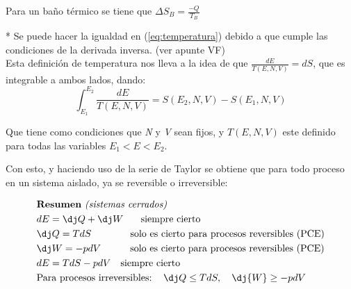 Para un baño térmico se tiene que $\Delta S_B = \frac{-Q}{T_B}$
\\





* Se puede hacer la igualdad en (\ref{eq:temperatura}) debido a que cumple las condiciones de la derivada inversa. (ver apunte VF)
\\

Esta definición de temperatura nos lleva a la idea de que $\frac{dE}{T(E,N,V)} = dS$, que es integrable a ambos lados, dando:
\[\int_{E_1}^{E_2} \frac{dE}{T(E,N,V)} = S(E_2,N,V) - S(E_1,N,V)\]

Que tiene como condiciones que \textit{N} y \textit{V} sean fijos, y $T(E,N,V)$ este definido para todas las variables $E_1 < E < E_2$.
\newline


Con esto, y haciendo uso de la serie de Taylor se obtiene que para todo proceso en un sistema aislado, ya se reversible o irreversible:



\begin{equation}
    \label{otros:resumen}
    \begin{split}
        & \text{\textbf{Resumen} \textit{(sistemas cerrados)}}\\
        & dE = \dj Q + \dj W \quad \hspace{8px} \text{siempre cierto} \\
        & \dj Q = TdS \quad \quad \quad \quad \text{solo es cierto para procesos reversibles (PCE)} \\
        & \dj W = -pdV \quad \quad \quad \text{solo es cierto para procesos reversibles (PCE)} \\
        & dE = TdS -pdV \quad \text{siempre cierto} \\
        & \text{Para procesos irreversibles: \hspace{3px} $\dj Q \leq TdS, \quad \dj{W} \geq -pdV$}
    \end{split}
\end{equation}

